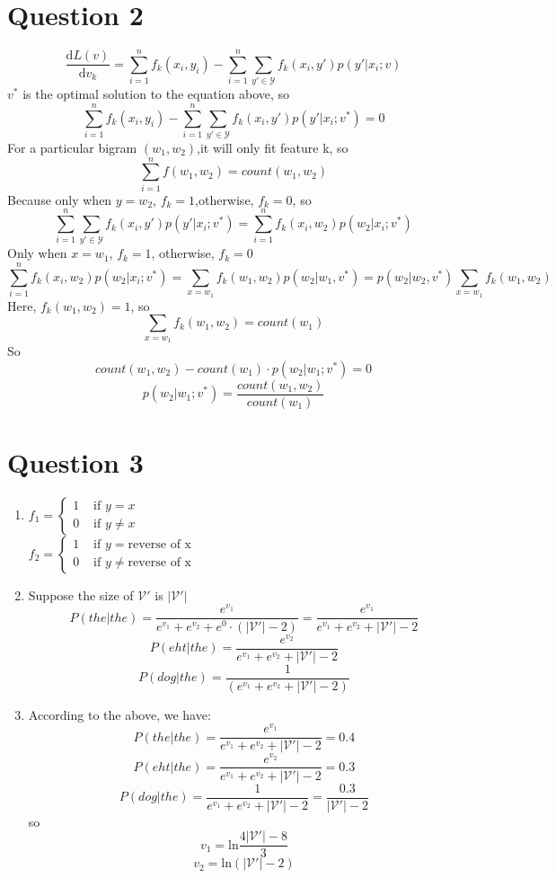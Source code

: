 \documentclass[12pt]{article}
\begin{document}
\section*{Question 2}
$$\frac{\mathrm{d} L(v)}{\mathrm{d} v_k}=\sum _{i=1}^nf_k(x_i,y_i)-\sum_{i=1}^{n}\sum_{y'\in \mathcal Y}f_k(x_i,y')p(y'|x_i;v)$$
$v^*$ is the optimal solution to the equation above, so\\
$$\sum _{i=1}^nf_k(x_i,y_i)-\sum_{i=1}^{n}\sum_{y'\in \mathcal Y}f_k(x_i,y')p(y'|x_i;v^*)=0$$
For a particular bigram $(w_1,w_2)$,it will only fit feature k, so
$$\sum _{i=1}^nf(w_1,w_2)=count(w_1,w_2)$$
Because only when $y=w_2$, $f_k=1$,otherwise, $f_k=0$, so \\
$$\sum_{i=1}^{n}\sum_{y'\in \mathcal Y}f_k(x_i,y')p(y'|x_i;v^*)=\sum_{i=1}^{n}f_k(x_i,w_2)p(w_2|x_i;v^*)$$
Only when $x=w_1$, $f_k=1$, otherwise, $f_k=0$\\
$$\sum_{i=1}^{n}f_k(x_i,w_2)p(w_2|x_i;v^*)=\sum_{x=w_1}f_k(w_1,w_2)p(w_2|w_1,v^*)=p(w_2|w_2,v^*)\sum_{x=w_1}f_k(w_1,w_2)$$
Here, $f_k(w_1,w_2)=1$, so \\
$$\sum_{x=w_1}f_k(w_1,w_2)=count(w_1)$$
So\\
$$count(w_1,w_2)-count(w_1)\cdot p(w_2|w_1;v^*)=0$$
$$p(w_2|w_1;v^*)=\frac{count(w_1,w_2)}{count(w_1)}$$


\section*{Question 3}
\begin{enumerate}
	\item 
	$f_1=\begin{cases}
		1 & \text{ if } y=x \\ 
		0 & \text{ if } y\neq x 
	\end{cases}$\\
	$ f_2=\begin{cases}
	1 & \text{ if } y=\text{reverse of x} \\ 
	0 & \text{ if } y\neq \text{reverse of x}
	\end{cases}$
	
	\item 
	Suppose the size of $\mathcal {V'}$ is $|\mathcal {V'}|$\\
	$$P (the|the)=\frac{e^{v_1}}{e^{v_1}+e^{v_2}+e^0\cdot (|\mathcal{V'}|-2)}=\frac{e^{v_1}}{e^{v_1}+e^{v_2}+|\mathcal{V'}|-2}$$
	$$P (eht|the)=\frac{e^{v_2}}{e^{v_1}+e^{v_2}+|\mathcal{V'}|-2}$$
	$$P (dog|the)=\frac{1}{(e^{v_1}+e^{v_2}+|\mathcal{V'}|-2)}$$
	
	\item
	According to the above, we have:
	$$P (the|the)=\frac{e^{v_1}}{e^{v_1}+e^{v_2}+|\mathcal{V'}|-2}=0.4$$
	$$P (eht|the)=\frac{e^{v_2}}{e^{v_1}+e^{v_2}+|\mathcal{V'}|-2}=0.3$$
	$$P (dog|the)=\frac{1}{e^{v_1}+e^{v_2}+|\mathcal{V'}|-2}=\frac{0.3}{|\mathcal{V'}|-2}$$
	so
	$$v_1=\text{ln}\frac{4|\mathcal{V'}|-8}{3}$$
	$$v_2=\text{ln}(|\mathcal{V'}|-2)$$
\end{enumerate}







\end{document}
